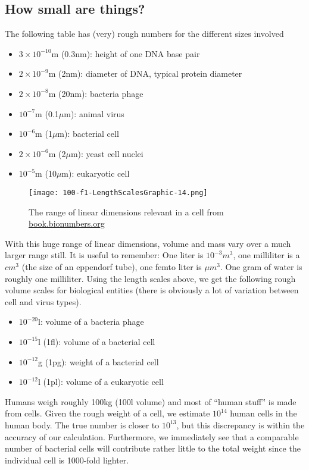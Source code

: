 \subsection{How small are things?}
The following table has (very) rough numbers for the different sizes involved

\begin{itemize}
  \item $3\times 10^{-10}$m (0.3nm): height of one DNA base pair
  \item $2\times 10^{-9}$m (2nm): diameter of DNA, typical protein diameter
  \item $2\times 10^{-8}$m (20nm): bacteria phage
  \item $10^{-7}$m (0.1$\mu$m): animal virus
  \item $10^{-6}$m (1$\mu$m): bacterial cell
  \item $2\times 10^{-6}$m (2$\mu$m): yeast cell nuclei
  \item $10^{-5}$m (10$\mu$m): eukaryotic cell
\end{itemize}

\begin{figure}[h]
	\centering
	\texttt{[image: 100-f1-LengthScalesGraphic-14.png]}
	\caption{The range of linear dimensions relevant in a cell from \href{http://book.bionumbers.org/size-and-geometry-introduction/}{book.bionumbers.org}}
	\label{fig:length_scales}
\end{figure}

With this huge range of linear dimensions, volume and mass vary over a much larger range still.
It is useful to remember: One liter is $10^{-3}m^3$, one milliliter is a $cm^3$ (the size of an eppendorf tube), one femto liter is $\mu m^3$. One gram of water is roughly one milliliter.
Using the length scales above, we get the following rough volume scales for biological entities (there is obviously a lot of variation between cell and virus types).

\begin{itemize}
  \item $10^{-20}$l: volume of a bacteria phage
  \item $10^{-15}$l (1fl): volume of a bacterial cell
  \item $10^{-12}$g (1pg): weight of a bacterial cell
  \item $10^{-12}$l (1pl): volume of a eukaryotic cell
\end{itemize}

Humans weigh roughly 100kg (100l volume) and most of ``human stuff'' is made from cells. Given the rough weight of a cell, we estimate $10^{14}$ human cells in the human body.
The true number is closer to $10^{13}$, but this discrepancy is within the accuracy of our calculation.
Furthermore, we immediately see that a comparable number of bacterial cells will contribute rather little to the total weight since the individual cell is 1000-fold lighter.


